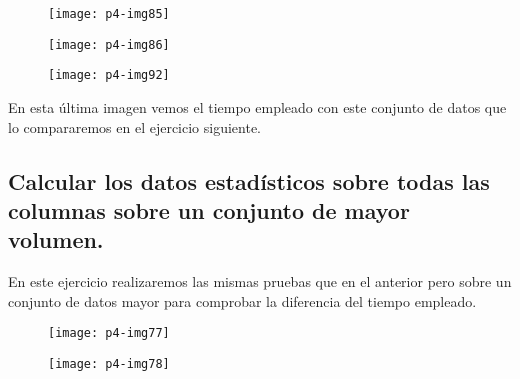 \documentclass[10pt]{article}
\begin{document}
\begin{figure}[H]
	\begin{center}
 		\texttt{[image: p4-img85]}
	\end{center} 
\end{figure}

\begin{figure}[H]
	\begin{center}
 		\texttt{[image: p4-img86]}
	\end{center} 
\end{figure}

\begin{figure}[H]
	\begin{center}
 		\texttt{[image: p4-img92]}
	\end{center} 
\end{figure}

En esta última imagen vemos el tiempo empleado con este conjunto de datos que lo compararemos en el ejercicio siguiente.\\


\subsection{Calcular los datos estadísticos sobre todas las columnas sobre un conjunto de mayor volumen.}
En este ejercicio realizaremos las mismas pruebas que en el anterior pero sobre un conjunto de datos mayor para comprobar la diferencia del tiempo empleado. \\

\begin{figure}[H]
	\begin{center}
 		\texttt{[image: p4-img77]}
	\end{center} 
\end{figure}

\begin{figure}[H]
	\begin{center}
 		\texttt{[image: p4-img78]}
	\end{center} 
\end{figure}
\end{document}
